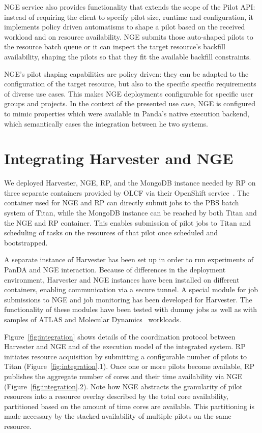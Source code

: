 \documentclass{webofc}
\begin{document}
NGE service also provides functionality that extends the scope of the Pilot
API: instead of requiring the client to specify pilot size, runtime and
configuration, it implements policy driven automatisms to shape a pilot based
on the received workload and on resource availability. NGE submits those
auto-shaped pilots to the resource batch queue or it can inspect the target
resource's backfill availability, shaping the pilots so that they fit the
available backfill constraints.
	
NGE's pilot shaping capabilities are policy driven: they can be adapted to
the configuration of the target resource, but also to the specific specific
requirements of diverse use cases. This makes NGE deployments configurable
for specific user groups and projects. In the context of the presented use
case, NGE is configured to mimic properties which were available in Panda's
native execution backend, which semantically eases the integration between
he two systems.


\section{Integrating Harvester and NGE}\label{sec:integration}

We deployed Harvester, NGE, RP, and the MongoDB instance needed by RP on
three separate containers provided by OLCF via their OpenShift
service~\cite{openshift}. The container used for NGE and RP can directly
submit jobs to the PBS batch system of Titan, while the MongoDB instance can
be reached by both Titan and the NGE and RP container. This enables
submission of pilot jobs to Titan and scheduling of tasks on the resources of
that pilot once scheduled and bootstrapped.

A separate instance of Harvester has been set up in order to run experiments
of PanDA and NGE interaction. Because of differences in the deployment
environment, Harvester and NGE instances have been installed on different
containers, enabling communication via a secure tunnel. A special module for
job submissions to NGE and job monitoring has been developed for Harvester.
The functionality of these modules have been tested with dummy jobs as well
as with samples of ATLAS and Molecular Dynamics~\cite{Brooks2009CHARMMTB}
workloads.

Figure~\ref{fig:integration} shows details of the coordination protocol
between Harvester and NGE and of the execution model of the integrated
system. RP initiates resource acquisition by submitting a configurable number
of pilots to Titan (Figure~\ref{fig:integration}.1). Once one or more pilots
become available, RP publishes the aggregate number of cores and their time
availability via NGE (Figure~\ref{fig:integration}.2). Note how NGE abstracts
the granularity of pilot resources into a resource overlay described by the
total core availability, partitioned based on the amount of time cores are
available. This partitioning is made necessary by the stacked availability of
multiple pilots on the same resource.
\end{document}
